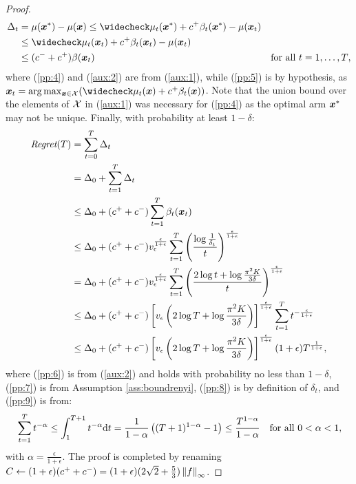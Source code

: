 \begin{proof}
\begin{align}
		\Delta_t &= \mu(\vx^*) - \mu(\vx) \leq 
		\wc{\mu_t}(\vx^*) + c^{+}\beta_t(\vx^*) - \mu(\vx_t) \label{pp:4}\\
		&\leq \wc{\mu_t}(\vx_t) + c^{+}\beta_t(\vx_t) - \mu(\vx_t) \label{pp:5}\\
		&\leq (c^{-} + c^{+})\beta(\vx_t) & \text{for all $t=1,\dots,T$}\label{aux:2}, 
	\end{align}
	where (\ref{pp:4}) and (\ref{aux:2}) are from (\ref{aux:1}), while (\ref{pp:5}) is by hypothesis, as $\vx_t=\arg\max_{\vx\in\Xspace}(\wc{\mu_t}(\vx) + c^{+}\beta_t(\vx))$.
	Note that the union bound over the elements of $\Xspace$ in (\ref{aux:1}) was necessary for (\ref{pp:4}) as the optimal arm $\vx^*$ may not be unique.
	Finally, with probability at least $1-\delta$:
	\begin{align}
		\Reg(T) &= \sum_{t=0}^{T}\Delta_t \nonumber\\
		&= \Delta_0  + \sum_{t=1}^{T}\Delta_t \nonumber\\
		&\leq \Delta_0  + (c^{+}+c^{-})\sum_{t=1}^{T}\beta_t(\vx_t) \label{pp:6}\\
		&\leq \Delta_0  + (c^{+}+c^{-})v_{\epsilon}^{\frac{\epsilon}{1+\epsilon}}\sum_{t=1}^{T}\left(\frac{\log\frac{1}{\delta_t}}{t}\right)^{\frac{\epsilon}{1+\epsilon}} \label{pp:7}\\
		&=\Delta_0  + (c^{+}+c^{-})v_{\epsilon}^{\frac{\epsilon}{1+\epsilon}}\sum_{t=1}^{T}\left(\frac{2\log t + \log\frac{\pi^2K}{3\delta}}{t}\right)^{\frac{\epsilon}{1+\epsilon}} \label{pp:8}\\
		&\leq \Delta_0  + (c^{+}+c^{-})\left[v_{\epsilon}\left(2\log T + \log\frac{\pi^2K}{3\delta}\right)\right]^{\frac{\epsilon}{1+\epsilon}}\sum_{t=1}^{T}t^{-\frac{\epsilon}{1+\epsilon}} \nonumber\\
		&\leq \Delta_0  + (c^{+}+c^{-})\left[v_{\epsilon}\left(2\log T + \log\frac{\pi^2K}{3\delta}\right)\right]^{\frac{\epsilon}{1+\epsilon}}(1+\epsilon)T^{\frac{1}{1+\epsilon}} \label{pp:9},
	\end{align}
	where (\ref{pp:6}) is from (\ref{aux:2}) and holds with probability no less than $1-\delta$, (\ref{pp:7}) is from Assumption \ref{ass:boundrenyi}, (\ref{pp:8}) is by definition of $\delta_t$, and (\ref{pp:9}) is from: 
	\begin{align}\label{aux:3}
		&\sum_{t=1}^{T}t^{-\alpha} \leq \int_{1}^{T+1}t^{-\alpha}\de t
		= \frac{1}{1-\alpha}\left((T+1)^{1-\alpha} - 1\right) \leq \frac{T^{1-\alpha}}{1-\alpha} &\text{for all $0<\alpha<1$},
	\end{align}
	with $\alpha=\frac{\epsilon}{1+\epsilon}$.
	The proof is completed by renaming $C\gets (1+\epsilon)(c^{+}+c^{-}) = (1+\epsilon)(2\sqrt{2} + \frac{5}{3})\norm[\infty]{f}$.
\end{proof}

